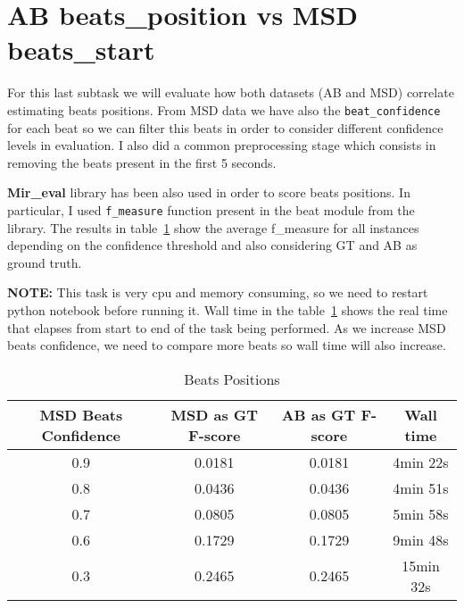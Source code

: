 \documentclass[a4paper]{article}
\begin{document}
\section{AB beats\_position vs MSD beats\_start}
For this last subtask we will evaluate how both datasets (AB and MSD) correlate estimating beats positions. From MSD data we have also the \texttt{beat\_confidence} for each beat so we can filter this beats in order to consider different confidence levels in evaluation.
I also did a common preprocessing stage which consists in removing the beats present in the first 5 seconds.

\textbf{Mir\_eval} library has been also used in order to score beats positions. In particular, I used \texttt{f\_measure} function present in the beat module from the library. The results in table~\ref{tab:beats} show the average f\_measure for all instances depending on the confidence threshold and also considering GT and AB as ground truth. 

\textbf{NOTE:} This task is very cpu and memory consuming, so we need to restart python notebook before running it. Wall time in the table~\ref{tab:beats} shows the real time that elapses from start to end of the task being performed. As we increase MSD beats confidence, we need to compare more beats so wall time will also increase.

\begin{table}[ht!]
\centering
\begin{tabular}{cccc}
\textbf{MSD Beats Confidence} & \textbf{MSD as GT F-score} & \textbf{AB as GT F-score} & Wall time\footnotemark \\ \hline 
0.9 & 0.0181 & 0.0181 & 4min 22s \\	
0.8 & 0.0436 & 0.0436 & 4min 51s \\ 
0.7 & 0.0805 & 0.0805 & 5min 58s \\
0.6 & 0.1729 & 0.1729 & 9min 48s \\ 
0.3 & 0.2465 & 0.2465 & 15min 32s \\\hline
\end{tabular}
\caption{Beats Positions}
\label{tab:beats}
\end{table}
\end{document}
